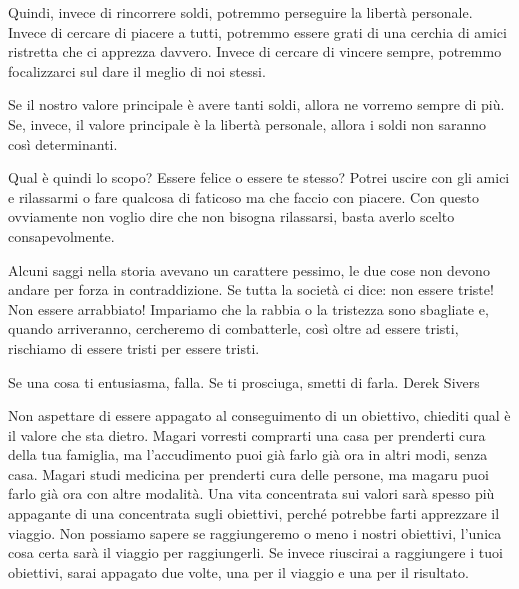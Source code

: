 \documentclass[12pt]{book} %
\begin{document}
Quindi, invece di rincorrere soldi, potremmo perseguire la libertà personale. Invece di cercare di piacere a tutti,
potremmo essere grati di una cerchia di amici ristretta che ci apprezza davvero. 
Invece di cercare di vincere sempre, potremmo focalizzarci sul dare il meglio di noi stessi. 

Se il nostro valore principale è avere tanti soldi, allora ne vorremo sempre di più. Se, invece, il valore principale è la libertà
personale, allora i soldi non saranno così determinanti. 

Qual è quindi lo scopo? Essere felice o essere te stesso? Potrei uscire con gli
amici e rilassarmi o fare qualcosa di faticoso ma che faccio con piacere. Con questo ovviamente non voglio dire che non
bisogna rilassarsi, basta averlo scelto consapevolmente.

Alcuni saggi nella storia avevano un carattere pessimo, le due cose non devono andare per forza in contraddizione. 
Se tutta la società ci dice: non essere triste! Non essere arrabbiato! Impariamo che la rabbia o la tristezza sono sbagliate e, quando arriveranno, cercheremo di combatterle, così oltre ad essere tristi, rischiamo di essere tristi per essere tristi.

Se una cosa ti entusiasma, falla. Se ti prosciuga, smetti di farla.
Derek Sivers 

Non aspettare di essere appagato al conseguimento di un obiettivo, chiediti qual è il valore
che sta dietro. Magari vorresti comprarti una casa per prenderti cura della tua famiglia, ma l'accudimento puoi già farlo già ora in altri modi, senza casa.
Magari studi medicina per prenderti cura delle persone, ma magaru puoi farlo già ora con altre modalità. Una vita
concentrata sui valori sarà spesso più appagante di una concentrata sugli obiettivi, perché potrebbe farti apprezzare
il viaggio. Non possiamo sapere se raggiungeremo o meno i nostri obiettivi, l'unica cosa certa
sarà il viaggio per raggiungerli. Se invece riuscirai a raggiungere i tuoi obiettivi, sarai appagato due volte, una per
il viaggio e una per il risultato.
\end{document}
